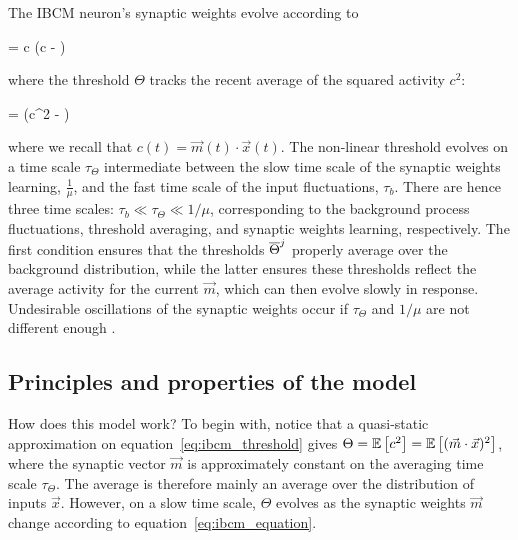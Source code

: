 The IBCM neuron's synaptic weights evolve according to \cite{intrator_objective_1992, udeigwe_emergent_2017}

\beq
	 = \mu c \left(c - \Theta \right) 
	\label{eq:ibcm_equation}
\eeq

where the threshold $\Theta$ tracks the recent average of the squared activity $c^2$:

\beq
	 =  (c^2 - \Theta)  
	\label{eq:ibcm_threshold}
\eeq

where we recall that $c(t) = \vec{m}(t) \cdot \vec{x}(t)$. 
The non-linear threshold evolves on a time scale $\tau_{\Theta}$ intermediate between the slow time scale of the synaptic weights learning, $\frac{1}{\mu}$, and the fast time scale of the input fluctuations, $\tau_b$. There are hence three time scales: $\tau_b \ll \tau_{\Theta} \ll  1 / \mu$, corresponding to the background process fluctuations, threshold averaging, and synaptic weights learning, respectively. The first condition ensures that the thresholds $\overline{\Theta}^j$ properly average over the background distribution, while the latter ensures these thresholds reflect the average activity for the current $\vec{m}$, which can then evolve slowly in response. Undesirable oscillations of the synaptic weights occur if $\tau_{\Theta}$ and $1 / \mu$ are not different enough \cite{udeigwe_emergent_2017}. 

\subsection{Principles and properties of the model}
\label{subsect:ibcm_principles}

How does this model work? To begin with, notice that a quasi-static approximation on equation~\eqref{eq:ibcm_threshold} gives $\Theta = \mathbb{E}\left[ c^2 \right] = \mathbb{E}\left[ (\vec{m} \cdot \vec{x})^2 \right]$, where the synaptic vector $\vec{m}$ is approximately constant on the averaging time scale $\tau_\Theta$. The average is therefore mainly an average over the distribution of inputs $\vec{x}$. However, on a slow time scale, $\Theta$ evolves as the synaptic weights $\vec{m}$ change according to equation~\eqref{eq:ibcm_equation}. 

